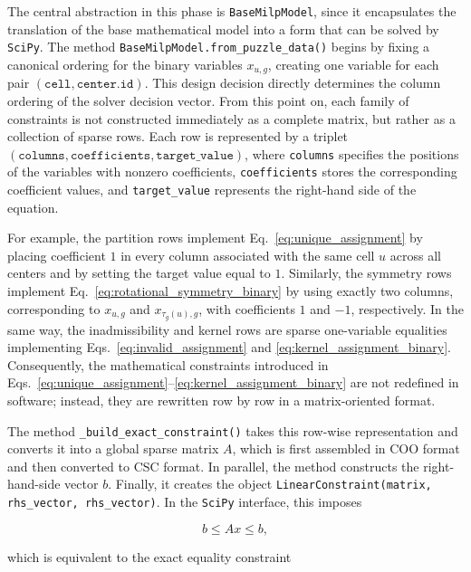 The central abstraction in this phase is \texttt{BaseMilpModel}, since it encapsulates the translation of the base mathematical model into a form that can be solved by \texttt{SciPy}. The method \texttt{BaseMilpModel.from\_puzzle\_data()} begins by fixing a canonical ordering for the binary variables \(x_{u,g}\), creating one variable for each pair \((\texttt{cell}, \texttt{center.id})\). This design decision directly determines the column ordering of the solver decision vector. From this point on, each family of constraints is not constructed immediately as a complete matrix, but rather as a collection of sparse rows. Each row is represented by a triplet \((\texttt{columns}, \texttt{coefficients}, \texttt{target\_value})\), where \texttt{columns} specifies the positions of the variables with nonzero coefficients, \texttt{coefficients} stores the corresponding coefficient values, and \texttt{target\_value} represents the right-hand side of the equation.

For example, the partition rows implement Eq.~\eqref{eq:unique_assignment} by
placing coefficient \(1\) in every column associated with the same cell \(u\)
across all centers and by setting the target value equal to \(1\). Similarly,
the symmetry rows implement Eq.~\eqref{eq:rotational_symmetry_binary} by using
exactly two columns, corresponding to \(x_{u,g}\) and
\(x_{\tau_g(u),g}\), with coefficients \(1\) and \(-1\), respectively. In the
same way, the inadmissibility and kernel rows are sparse one-variable
equalities implementing Eqs.~\eqref{eq:invalid_assignment} and
\eqref{eq:kernel_assignment_binary}. Consequently, the mathematical
constraints introduced in Eqs.~\eqref{eq:unique_assignment}--\eqref{eq:kernel_assignment_binary}
are not redefined in software; instead, they are rewritten row by row in a
matrix-oriented format.

The method \texttt{\_build\_exact\_constraint()} takes this row-wise representation and converts it into a global sparse matrix \(A\), which is first assembled in COO format and then converted to CSC format. In parallel, the method constructs the right-hand-side vector \(b\). Finally, it creates the object \texttt{LinearConstraint(matrix, rhs\_vector, rhs\_vector)}. In the \texttt{SciPy} interface, this imposes

\begin{equation}
b \leq A x \leq b,
\label{eq:scipy_linear_constraint_bounds}
\end{equation}

which is equivalent to the exact equality constraint

